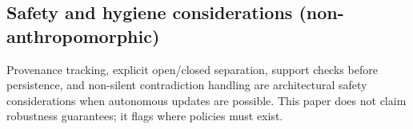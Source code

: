 \subsection{Safety and hygiene considerations (non-anthropomorphic)}
Provenance tracking, explicit open/closed separation, support checks before persistence, and non-silent contradiction handling are architectural safety considerations when autonomous updates are possible.
This paper does not claim robustness guarantees; it flags where policies must exist.
